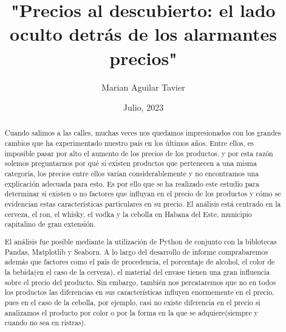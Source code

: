 \documentclass[a4paper,12pt]{article}
\begin{document}
    
	\title{"Precios al descubierto: el lado oculto detrás de los alarmantes precios"}
	\author{Marian Aguilar Tavier}
	\date{Julio, 2023}
	\maketitle
	
	\newpage
	\begin{abstract}
		Cuando salimos a las calles, muchas veces nos quedamos impresionados con los grandes cambios que ha experimentado nuestro país en los últimos años. Entre ellos, es imposible pasar por alto el aumento de los precios de los productos, y por esta razón solemos preguntarnos por qué si existen productos que pertenecen a una misma categoría, los precios entre ellos varían considerablemente y no encontramos una explicación adecuada para esto.
		Es por ello que se ha realizado este estudio para determinar si existen o no factores que influyan en el precio de los productos y cómo se evidencian estas características particulares en su precio. El  análisis está centrado en la cerveza, el ron, el whisky, el vodka y la cebolla en Habana del Este, municipio capitalino de gran extensión.
		
		El análisis fue posible mediante la utilización de Python de conjunto con la biblotecas Pandas, Matplotlib y Seaborn.
		A lo largo del desarrollo de informe comprabaremos además que factores como el país de procedencia, el porcentaje de alcohol, el color de la bebida(en el caso de la cerveza), el material del envase tienen una gran influencia sobre el precio del producto.
		Sin embargo, también nos percataremos que no en todos los productos las diferencias en sus características influyen enormemente en el precio, pues en el caso de la cebolla, por ejemplo, casi no existe diferencia en el precio si analizamos el producto por color o por la forma en la que se adquiere(siempre y cuando no sea en ristras).
	\end{abstract}
    \newpage
    
	\tableofcontents
    \newpage
\end{document}
